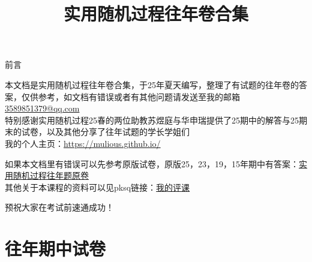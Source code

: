 \documentclass[UTF8,openany]{book}
\title{\Huge 实用随机过程往年卷合集}
\author{\Large \calligra{NULIOUS}}
\date{}
\begin{document}
\maketitle
\frontmatter 
\begin{center}
	\Huge 前言
\end{center}

{\Large 本文档是实用随机过程往年卷合集，于25年夏天编写，整理了有试题的往年卷的答案，仅供参考，如文档有错误或者有其他问题请发送至我的邮箱\href{mailto:3589851379@qq.com}{3589851379@qq.com}
\vspace{5mm}\\

特别感谢实用随机过程25春的两位助教苏煜庭与华申瑞提供了25期中的解答与25期末的试卷，以及其他分享了往年试题的学长学姐们
\vspace{5mm}\\

我的个人主页：\url{https://mulious.github.io/}

如果本文档里有错误可以先参考原版试卷，原版25，23，19，15年期中有答案：\href{https://github.com/mulious/USTCexam/tree/main/stochastic-processes/original-exam}{实用随机过程往年题原卷}
\vspace{5mm}\\

其他关于本课程的资料可以见pksq链接：\href{https://icourse.club/course/2093/#review-93966}{我的评课}}
\vspace{1cm}
\begin{center}
	\huge 预祝大家在考试前速通成功！
\end{center}
\tableofcontents 
\afterpage{\clearpage}
\mainmatter
\chapter{\centering 往年期中试卷}
\end{document}
